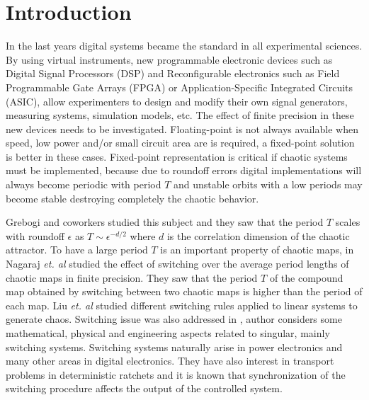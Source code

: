 \section{Introduction} \label{sec:intro}

In the last years digital systems became the standard in all experimental sciences.
By using virtual instruments, new programmable electronic devices such as Digital Signal Processors (DSP) and Reconfigurable electronics such as Field Programmable Gate Arrays (FPGA) or Application-Specific Integrated Circuits (ASIC), allow experimenters to design and modify their own signal generators, measuring systems, simulation models, etc.
The effect of finite precision in these new devices needs to be investigated.
Floating-point is not always available when speed, low power and/or small circuit area are is required, a fixed-point solution is better in these cases.
Fixed-point representation is critical if chaotic systems must be implemented, because due to roundoff errors digital implementations will always become periodic with period $T$ and unstable orbits with a low periods may become stable destroying completely the chaotic behavior.

Grebogi and coworkers \cite{Grebogi1988} studied this subject and they saw that the period $T$ scales with roundoff $\epsilon$ as $T\sim\epsilon^{-d/2}$ where $d$ is the correlation dimension of the chaotic attractor.
To have a large period $T$ is an important property of chaotic maps, in \cite{Nagaraj2008} Nagaraj \textit{et. al} studied the effect of switching over the average period lengths of chaotic maps in finite precision.
They saw that the period $T$ of the compound map obtained by switching between two chaotic maps is higher than the period of each map.
Liu \textit{et. al} \cite{Liu2006} studied different switching rules applied to linear systems to generate chaos.
Switching issue was also addressed in \cite{Gluskin2008}, author considers some mathematical, physical and engineering aspects related to singular, mainly switching systems.
Switching systems naturally arise in power electronics and many other areas in digital electronics.
They have also interest in transport problems in deterministic ratchets \cite{Zarlenga2009} and it is known that synchronization of the switching procedure affects the output of the controlled system.

